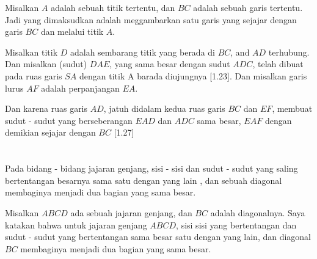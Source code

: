 \documentclass[a4paper, 12pt]{book}
\begin{document}

Misalkan $A$ adalah sebuah titik tertentu, dan $BC$ adalah sebuah garis tertentu. Jadi
yang dimaksudkan adalah meggambarkan satu garis yang sejajar dengan garis $BC$ 
dan melalui titik $A$.

Misalkan titik $D$ adalah sembarang titik yang berada di $BC$, and $AD$ terhubung. 
Dan misalkan (sudut) $DAE$, yang sama besar dengan sudut $ADC$, telah dibuat 
pada ruas garis $SA$ dengan titik A barada diujungnya [1.23]. Dan misalkan garis
lurus $AF$ adalah perpanjangan $EA$.

Dan karena ruas garis $AD$, jatuh didalam  kedua ruas garis $BC$ dan $EF$, membuat 
sudut - sudut yang berseberangan $EAD$ dan $ADC$ sama besar, $EAF$ dengan demikian
sejajar dengan $BC$ [1.27]


\setcounter{section}{34}
\section*{\centering \thesection}

Pada bidang - bidang jajaran genjang, sisi - sisi dan sudut - sudut yang saling
bertentangan besarnya sama satu dengan yang lain , dan sebuah diagonal membaginya
menjadi dua bagian yang sama besar.


Misalkan $ABCD$ ada sebuah jajaran genjang, dan $BC$ adalah diagonalnya. Saya katakan
bahwa untuk jajaran genjang $ABCD$, sisi sisi yang bertentangan dan sudut - sudut yang bertentangan
sama besar satu dengan yang lain, dan diagonal $BC$ membaginya menjadi dua bagian yang sama besar.
\end{document}
